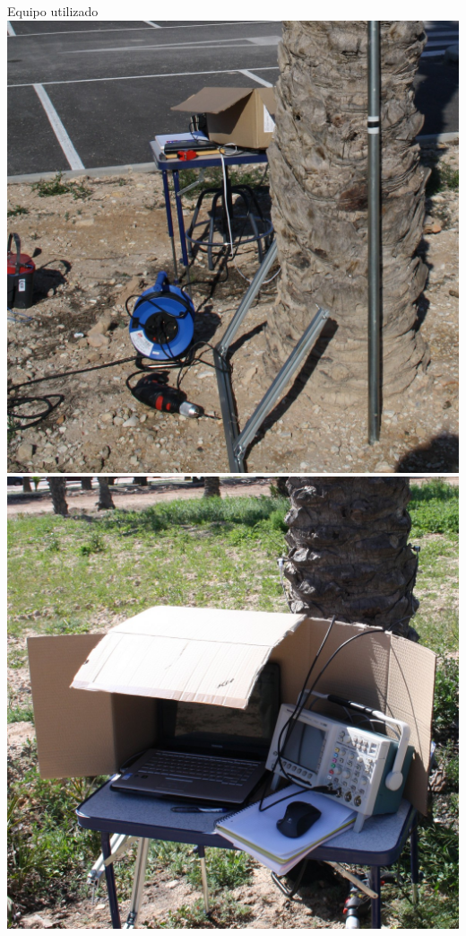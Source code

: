 \documentclass[utf8, compress]			{beamer}
\begin{document}
\begin{frame}{Equipo utilizado}
    \includegraphics{herramientas.jpg}
    \hspace{1em}
    \includegraphics{equipo.jpg}
\end{frame}
\end{document}
